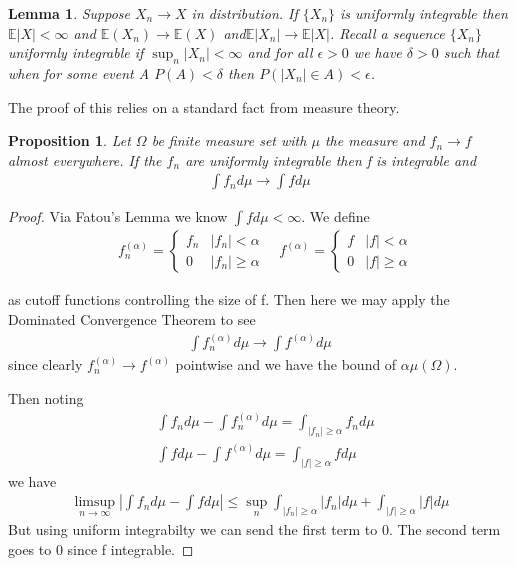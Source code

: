 \documentclass[10pt]{article}
\newcommand{\E}{\mathbb{E}}
\newcommand{\1}{\textbf{1}}
\newtheorem{prop}{Proposition}
\newtheorem{lemma}[theorem]{Lemma}
\theoremstyle{remark}
\theoremstyle{definition}
\begin{document}

\begin{lemma}
	Suppose $X_n \to X$ in distribution. If $\{X_n\}$ is uniformly integrable then $\E|X| < \infty$ and $\E(X_n) \to \E(X)$ and$\E |X_n| \to \E |X|$. Recall a sequence $\{X_n\}$ uniformly integrable if $\sup_n |X_n| < \infty$ and for all $\epsilon > 0$ we have $\delta > 0$ such that when for some event A $P(A) < \delta$ then $P(|X_n| \in A) < \epsilon$. 
\end{lemma}


The proof of this relies on a standard fact from measure theory.

\begin{prop}
	Let $\Omega$ be finite measure set with $\mu$ the measure and $f_n \to f$ almost everywhere. If the $f_n$ are uniformly integrable then f is integrable and
	\begin{align*}
		\int f_n d\mu \to \int f d\mu
	\end{align*}
\end{prop}

\begin{proof}
	Via Fatou's Lemma we know $\int f d\mu < \infty$. We define
	\begin{align*}
		&f_n^{{(\alpha)}} = 
		\begin{cases}
			f_n & |f_n| < \alpha \\
			0 & |f_n| \geq \alpha 
		\end{cases}\quad
		f^{(\alpha)} = 
		\begin{cases}
			f & |f| < \alpha\\
			0 & |f| \geq \alpha
		\end{cases}
	\end{align*}

	as cutoff functions controlling the size of f. Then here we may apply the Dominated Convergence Theorem to see
	\begin{align*}
		\int f_n^{(\alpha)} d\mu \to \int f^{(\alpha)} d\mu
	\end{align*}
	since clearly $f_n^{(\alpha)} \to f^{(\alpha)}$ pointwise and we have the bound of $\alpha \mu(\Omega)$. 

	Then noting
	\begin{align*}
		&\int f_n d\mu - \int f_n^{(\alpha)} d\mu = \int_{|f_n| \geq \alpha} f_n d\mu \\
		& \int f d\mu - \int f^{(\alpha)} d\mu = \int_{|f| \geq \alpha} fd\mu
	\end{align*} 
	we have
	\begin{align*}
		\limsup_{n \to \infty}|\int f_n d\mu - \int f d\mu| \leq \sup_n \int_{|f_n|\geq \alpha} |f_n| d\mu + \int_{|f| \geq \alpha} |f| d\mu
	\end{align*}
	But using uniform integrabilty we can send the first term to 0. The second term goes to 0 since f integrable. 
\end{proof}
\end{document}
